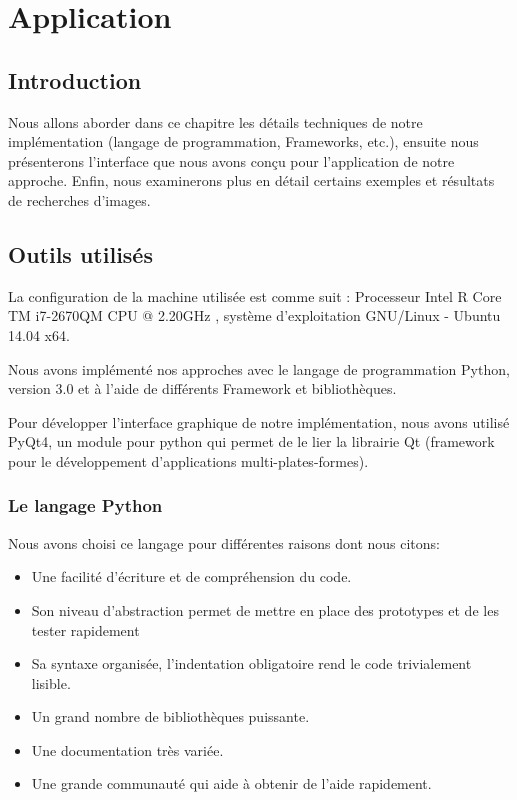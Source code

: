 
\chapter{Application} %

\section{Introduction}
	
	Nous allons aborder dans ce chapitre les détails techniques de notre implémentation (langage de programmation, Frameworks, etc.), ensuite nous présenterons l'interface que nous avons conçu pour l'application de notre approche. Enfin, nous examinerons plus en détail certains exemples et résultats de recherches d'images.

\section{Outils utilisés}

	La configuration de la machine utilisée est comme suit : Processeur Intel R Core TM i7-2670QM CPU @ 2.20GHz , système d’exploitation GNU/Linux - Ubuntu 14.04 x64.

	Nous avons implémenté nos approches avec le langage de programmation Python, version 3.0 et à l'aide de différents Framework et bibliothèques.

	Pour développer l'interface graphique de notre implémentation, nous avons utilisé PyQt4, un module pour python qui permet de le lier la librairie Qt (framework pour le développement d'applications multi-plates-formes).

\subsection{Le langage Python}
	Nous avons choisi ce langage pour différentes raisons dont nous citons:

\begin{itemize}

\item Une facilité d’écriture et de compréhension du code.
\item Son niveau d'abstraction permet de mettre en place des prototypes et de les tester rapidement
\item Sa syntaxe organisée, l'indentation obligatoire rend le code trivialement lisible.
\item Un grand nombre de bibliothèques puissante.
\item Une documentation très variée.
\item Une grande communauté qui aide à obtenir de l'aide rapidement.
\end{itemize}


